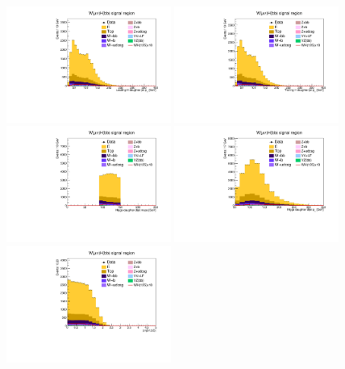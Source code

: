 \begin{figure}[tbp]
  \begin{center}
    \includegraphics[width=0.48\textwidth]{figures/wlnhbb2016/resolved/WmnWHSR_Hbjet1Pt.pdf}
    \includegraphics[width=0.48\textwidth]{figures/wlnhbb2016/resolved/WmnWHSR_Hbjet2Pt.pdf}
    \includegraphics[width=0.48\textwidth]{figures/wlnhbb2016/resolved/WmnWHSR_mH.pdf}
    \includegraphics[width=0.48\textwidth]{figures/wlnhbb2016/resolved/WmnWHSR_pTH.pdf}
    \includegraphics[width=0.48\textwidth]{figures/wlnhbb2016/resolved/WmnWHSR_dEtab1b2.pdf}

\end{center}
\end{figure}
